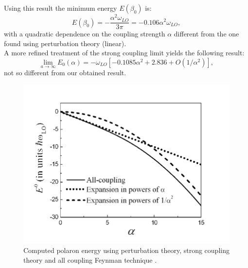 Using this result the minimum energy $E(\beta_0)$ is:
\begin{equation}
    E(\beta_0)=-\frac{\alpha^2\omega_{LO}}{3\pi}=-0.106\alpha^2\omega_{LO},
\end{equation}
with a quadratic dependence on the coupling strength $\alpha$ different from the one found using perturbation theory (linear).\\
A more refined treatment of the strong coupling limit \cite{miyake1976ground} yields the following result:
\begin{equation}
    \lim_{a\to\infty}E_0(\alpha)=-\omega_{LO}\left[-0.1085\alpha^2+2.836+O(1/\alpha^2)\right],
\end{equation}
not so different from our obtained result.
\begin{figure}[H]
    \centering
    \includegraphics[scale=0.8]{Feynman-polaron-energy-as-a-function-of-a-the-all-coupling-theory.png}
    \caption{Computed polaron energy using perturbation theory, strong coupling theory and all coupling 
    Feynman technique \cite{article_coupling}.}
    \label{fig:coupling_strength_Froehlich}
\end{figure}
